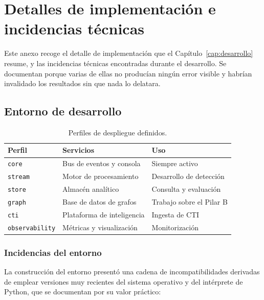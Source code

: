 \chapter{Detalles de implementación e incidencias técnicas}
\label{anx:implementacion}

Este anexo recoge el detalle de implementación que el Capítulo~\ref{cap:desarrollo} resume, y las
incidencias técnicas encontradas durante el desarrollo. Se documentan porque varias de ellas no
producían ningún error visible y habrían invalidado los resultados sin que nada lo delatara.

\section{Entorno de desarrollo}
\label{anx:entorno}

\begin{table}[H]
\centering
\begin{tabular}{|l|l|l|}
\hline
\textbf{Perfil} & \textbf{Servicios} & \textbf{Uso} \\
\hline
\texttt{core} & Bus de eventos y consola & Siempre activo \\
\texttt{stream} & Motor de procesamiento & Desarrollo de detección \\
\texttt{store} & Almacén analítico & Consulta y evaluación \\
\texttt{graph} & Base de datos de grafos & Trabajo sobre el Pilar B \\
\texttt{cti} & Plataforma de inteligencia & Ingesta de CTI \\
\texttt{observability} & Métricas y visualización & Monitorización \\
\hline
\end{tabular}
\caption{Perfiles de despliegue definidos.}
\label{tab:perfiles}
\end{table}

\subsection{Incidencias del entorno}

La construcción del entorno presentó una cadena de incompatibilidades derivadas de emplear
versiones muy recientes del sistema operativo y del intérprete de Python, que se documentan
por su valor práctico:

